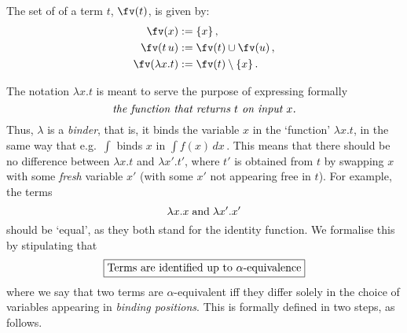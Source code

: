 \documentclass{svmult}
\begin{document}
\begin{mydefinition}\label{d:fv}
The set of  of a term $t$, $\fv(t)$, is given by:
\begin{align*}
\fv(x)  &:= \{ x \}\,, \\
\fv(t\,u) &:= \fv(t)\cup\fv(u)\,, \\
\fv(\lambda x.t) &:= \fv(t)\setminus\{x\}\,.
\end{align*}\deq[-1]
\end{mydefinition}
%
The notation $\lambda x.t$ is meant to serve the purpose of expressing formally
\[ \emph{the function that returns $t$ on input $x$.} \]
Thus, $\lambda$ is a \emph{binder}, that is, it binds the variable $x$ in the `function' $\lambda x.t$, in the same way that e.g.~$\int$ binds $x$ in
$\int f(x)\,dx$\,.
%
This means that there should be no difference between $\lambda x.t$ and $\lambda x'.t'$, where $t'$ is obtained from $t$ by swapping $x$ with some
\emph{fresh} variable $x'$ (\ie with some $x'$ not appearing free in $t$). For example, the terms
\[ \lambda x.x \text{\;and\;} \lambda x'.x' \]
should be `equal', as they both stand for the identity function. We formalise this by stipulating that
\[\fbox{\text{Terms are identified up to $\alpha$-equivalence}} \]
where we say that two terms are $\alpha$-equivalent iff they differ solely in the choice of variables appearing in \emph{binding positions}.
This is formally defined in two steps, as follows.
\end{document}
